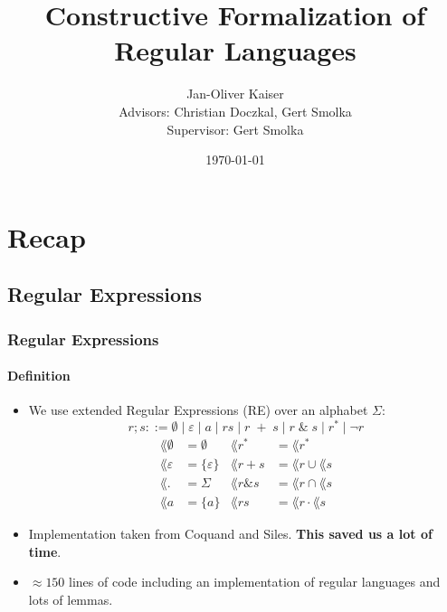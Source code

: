 \documentclass{beamer}
\begin{document}
\title[Constr. Formalization of Reg. Languages]{Constructive Formalization of Regular Languages}  
\author[Jan-Oliver Kaiser]{Jan-Oliver Kaiser \\{\small Advisors: Christian Doczkal, Gert Smolka }\\{\small Supervisor: Gert Smolka}}
\institute{ }

\date{\today} 


\begin{frame}
    \titlepage
\end{frame}

\begin{frame}
    \tableofcontents
\end{frame}




\section{Recap}
\subsection*{Regular Expressions}
\begin{frame}[fragile]
    \frametitle{Regular Expressions}
    \framesubtitle{Definition}

    \begin{itemize}
        \item 
            We use extended Regular Expressions (RE) over an alphabet $\Sigma$:
            \begin{equation*}    
                r; s ::= \emptyset \; | \; \varepsilon \; | \;  a \; | \; rs \; | \;  r \;  + \; s \; | \; r \; \& \; s \; |\; r^* \; | \; \neg r
            \end{equation*}\vspace{-2em}%
            \begin{align*}%
                \lang{\emptyset} & = \emptyset
                & 
                \lang{r^*} & = \lang{r}^* \\
                \lang{\varepsilon} & = \{\varepsilon\}
                & 
                \lang{r + s} & = \lang{r} \cup \lang{s} \\
                \lang{.} & = \Sigma
                & 
                \lang{r \& s} & = \lang{r} \cap \lang{s} \\
                \lang{a} & = \{a\}
                &
                \lang{r s} & = \lang{r} \cdot \lang{s}
            \end{align*}
        \item Implementation taken from Coquand and Siles.
            \textbf{This saved us a lot of time}.
        \item $\approx 150$ lines of code including an implementation of regular languages and lots of lemmas.
    \end{itemize}

\end{frame}
\end{document}

